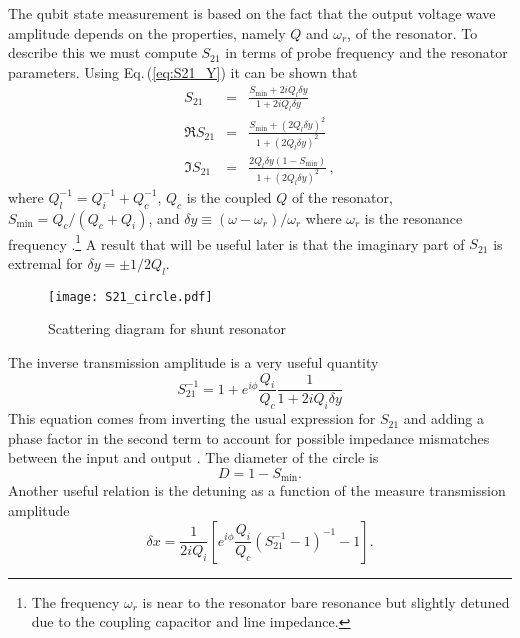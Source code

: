 The qubit state measurement is based on the fact that the output voltage wave amplitude depends on the properties, namely $Q$ and $\omega_r$, of the resonator.
To describe this we must compute $S_{21}$ in terms of probe frequency and the resonator parameters.
Using Eq.\,(\ref{eq:S21_Y}) it can be shown that \begin{eqnarray}
S_{21} &=& \frac{S_{\textrm{min}} + 2iQ_l \delta y}{1+2iQ_l \delta y} \label{eq:S21} \\
\Re S_{21} &=& \frac{S_{\textrm{min}}+(2Q_l\delta y)^2}{1+(2Q_l\delta y)^2} \\
\Im S_{21} &=& \frac{2Q_l\delta y(1-S_{\textrm{min}})}{1+(2Q_l\delta y)^2} \, , \end{eqnarray}
where $Q_l^{-1} = Q_i^{-1} + Q_c^{-1}$, $Q_c$ is the coupled $Q$ of the resonator, $S_{\textrm{min}} = Q_c/(Q_c + Q_i)$, and $\delta y \equiv (\omega - \omega_r) / \omega_r$ where $\omega_r$ is the resonance frequency \cite{Mazin:thesis2004}.\footnote{The frequency $\omega_r$ is near to the resonator bare resonance but slightly detuned due to the coupling capacitor and line impedance.}
A result that will be useful later is that the imaginary part of $S_{21}$ is extremal for $\delta y = \pm 1/2Q_l$.

\begin{figure}
\begin{centering}
\texttt{[image: S21\_circle.pdf]} 
\par\end{centering}
\caption{Scattering diagram for shunt resonator}
\label{Fig:S21Circle}
\end{figure}

The inverse transmission amplitude is a very useful quantity \begin{equation}
S_{21}^{-1} = 1 + e^{i\phi}\frac{Q_i}{Q_c}\frac{1}{1+2i Q_i \delta y} \end{equation}
This equation comes from inverting the usual expression for $S_{21}$ and adding a phase factor in the second term to account for possible impedance mismatches between the input and output \cite{Megrant:highQ2012}. The diameter of the circle is \begin{equation}
D = 1-S_{\textrm{min}}. \end{equation}
Another useful relation is the detuning as a function of the measure transmission amplitude \begin{equation}
\delta x = \frac{1}{2iQ_i}\left[ e^{i\phi} \frac{Q_i}{Q_c} \left(S_{21}^{-1} - 1 \right)^{-1} - 1 \right]. \end{equation}
